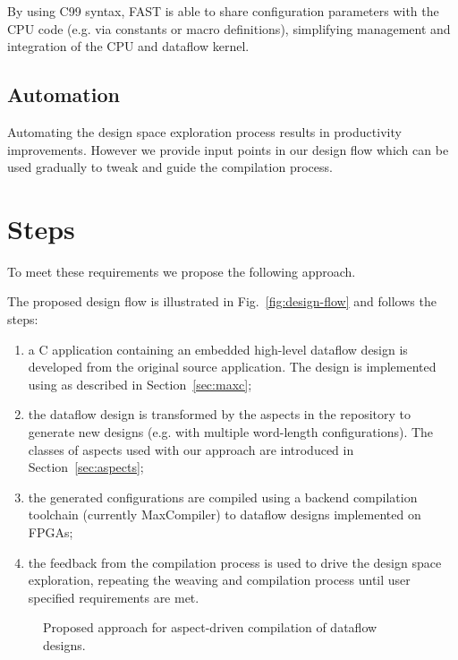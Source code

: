 By using C99 syntax, FAST is able to share configuration parameters
with the CPU code (e.g. via constants or macro definitions),
simplifying management and integration of the CPU and dataflow kernel.


\subsection{Automation}

Automating the design space exploration process results in
productivity improvements. However we provide input points in our
design flow which can be used gradually to tweak and guide the
compilation process.


\section{Steps}

To meet these requirements we propose the following approach.


The proposed design flow is illustrated in Fig.~\ref{fig:design-flow}
and follows the steps:
\begin{enumerate}
\item a C application containing an embedded high-level dataflow
  design is developed from the original source application. The design
  is implemented using \FAST{} as described in Section~\ref{sec:maxc};
\item the dataflow design is transformed by the aspects in the
  repository to generate new designs (e.g. with multiple word-length
  configurations). The classes of aspects used with our approach are
  introduced in Section~\ref{sec:aspects};
\item the generated configurations are compiled using a backend
  compilation toolchain (currently MaxCompiler) to dataflow designs
  implemented on FPGAs;
\item the feedback from the compilation process is used to drive the
  design space exploration, repeating the weaving and compilation
  process until user specified requirements are met.
\end{enumerate}


\begin{figure}[!ht]
  \centering
  \def\svgwidth{\textwidth}
  
  \caption{Proposed approach for aspect-driven compilation of dataflow
   designs.}
  \label{fig:reconfig-design-flow}
\end{figure}

